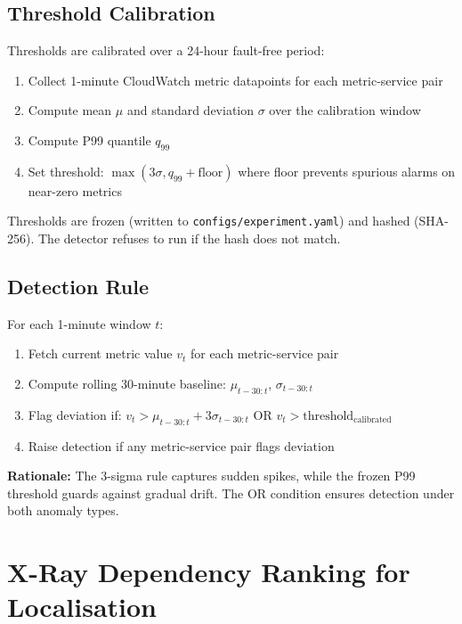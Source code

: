 \subsection{Threshold Calibration}

Thresholds are calibrated over a 24-hour fault-free period:

\begin{enumerate}
    \item Collect 1-minute CloudWatch metric datapoints for each metric-service pair
    \item Compute mean $\mu$ and standard deviation $\sigma$ over the calibration window
    \item Compute P99 quantile $q_{99}$
    \item Set threshold: $\max(3\sigma, q_{99} + \text{floor})$ where floor prevents spurious alarms on near-zero metrics
\end{enumerate}

Thresholds are frozen (written to \texttt{configs/experiment.yaml}) and hashed (SHA-256). The detector refuses to run if the hash does not match.

\subsection{Detection Rule}

For each 1-minute window $t$:

\begin{enumerate}
    \item Fetch current metric value $v_t$ for each metric-service pair
    \item Compute rolling 30-minute baseline: $\mu_{t-30:t}$, $\sigma_{t-30:t}$
    \item Flag deviation if: $v_t > \mu_{t-30:t} + 3\sigma_{t-30:t}$ OR $v_t > \text{threshold}_{\text{calibrated}}$
    \item Raise detection if any metric-service pair flags deviation
\end{enumerate}

\textbf{Rationale:} The 3-sigma rule captures sudden spikes, while the frozen P99 threshold guards against gradual drift. The OR condition ensures detection under both anomaly types.

\section{X-Ray Dependency Ranking for Localisation}

